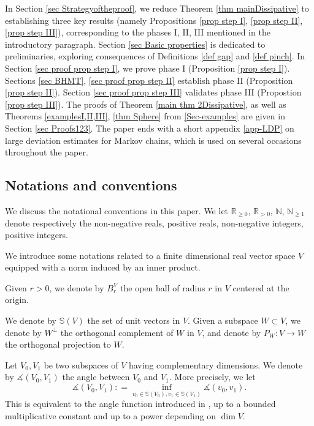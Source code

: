 \documentclass[11pt, leqno, fleqn]{amsart}
\newcommand{\SectionSymbol}{\textsection}
\def \R{{\mathbb R}}
\def \N{{\mathbb N}}
\theoremstyle{definition}
\theoremstyle{definition}
\def\S{ {\mathbb{S}} }
\begin{document}
In Section \ref{sec Strategyoftheproof}, we  reduce Theorem \ref{thm mainDissipative} to establishing three key results  (namely Propositions \ref{prop step I},  \ref{prop step II}, \ref{prop step III}), corresponding to the phases I, II, III mentioned in the introductory paragraph. 
Section \ref{sec Basic properties} is dedicated to preliminaries, exploring  consequences of  Definitions \ref{def gap} and \ref{def pinch}.
In  Section \ref{sec proof prop step I}, we prove phase I (Proposition \ref{prop step I}). Sections \ref{sec BHMT}, \ref{sec proof prop step II} establish phase II (Proposition \ref{prop step II}).  Section  \ref{sec proof prop step III} validates phase III (Propostion \ref{prop step III}).
The proofs of Theorem \ref{main thm 2Dissipative}, as well as 
Theorems \ref{examplesI,II,III}, \ref{thm Sphere} from \SectionSymbol \ref{Sec-examples} are given in Section \ref{sec Proofs123}. The paper ends with a short appendix  \ref{app-LDP} on large deviation estimates for Markov chains, which is used on several occasions throughout the paper. 






 \subsection{Notations and conventions} We discuss the notational conventions in this paper.
We let $\R_{\geq0}$, $\R_{>0}$, $\N$, $\N_{\geq1}$ denote respectively the non-negative reals, positive reals, non-negative integers, positive integers. 


 \bigskip

 We introduce some notations related to a finite dimensional real vector space $V$ equipped with a norm induced by an inner product. 
 
  
Given $r > 0$, we denote by $B^{V}_{r}$ the open ball of radius $r$ in $V$ centered at the origin.

 
We denote by $\S(V)$ the set of unit vectors in $V$.
Given a subspace $W \subset V$, we denote by $W^{\perp}$ the orthogonal complement of $W$ in $V$, and  denote by $P_{W}: V \to W$ the orthogonal projection to $W$.    
 
 
 
 
 Let $V_0, V_1$ be two subspaces of $V$ having complementary dimensions. 
We denote by $\measuredangle(V_0, V_1)$  the angle between $V_0$ and $V_1$. More precisely, we let 
$$\measuredangle(V_0, V_1) : = \inf_{v_0 \in \S(V_0), v_1 \in \S(V_1)} \measuredangle(v_0, v_1).$$ 
This is equivalent to the angle function introduced in \cite[\SectionSymbol 1.3]{BH2}, up to a bounded multiplicative 
constant and up to a power depending on $\dim V$.
\end{document}
